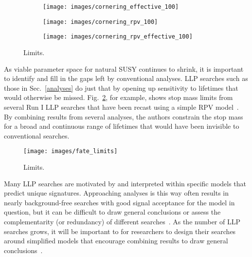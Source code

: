 \documentclass[12pt]{article}
\begin{document}
        \noindent \begin{figure}[htbp] \begin{center}
        \begin{subfigure}[htbp]{0.3\textwidth} \begin{center}
        \texttt{[image: images/cornering\_effective\_100]}
        \end{center} \end{subfigure}
        \begin{subfigure}[htbp]{0.3\textwidth} \begin{center}
        \texttt{[image: images/cornering\_rpv\_100]}
        \end{center} \end{subfigure}
        \begin{subfigure}[htbp]{0.3\textwidth} \begin{center}
        \texttt{[image: images/cornering\_rpv\_effective\_100]}
        \end{center} \end{subfigure}
        \caption{Limits.~\cite{cornering}}
        \label{cornering_limits}
        \end{center} \end{figure}

    As viable parameter space for natural SUSY continues to shrink, it is important to identify and fill in the gaps left by conventional analyses. LLP searches such as those in Sec.~\ref{analyses} do just that by opening up sensitivity to lifetimes that would otherwise be missed. Fig.~\ref{fate_limits}, for example, shows stop mass limits from several Run I LLP searches that have been recast using a simple RPV model~\cite{fate}. By combining results from several analyses, the authors constrain the stop mass for a broad and continuous range of lifetimes that would have been invisible to conventional searches. 

        \noindent \begin{figure}[htbp] \begin{center}
        \texttt{[image: images/fate\_limits]}
        \caption{Limits.~\cite{fate}}
        \label{fate_limits}
        \end{center} \end{figure}

    Many LLP searches are motivated by and interpreted within specific models that predict unique signatures. Approaching analyses is this way often results in nearly background-free searches with good signal acceptance for the model in question, but it can be difficult to draw general conclusions or assess the complementarity (or redundancy) of different searches~\cite{fate}. As the number of LLP searches grows, it will be important to for researchers to design their searches around simplified models that encourage combining results to draw general conclusions~\cite{evans_talk}.
\end{document}
